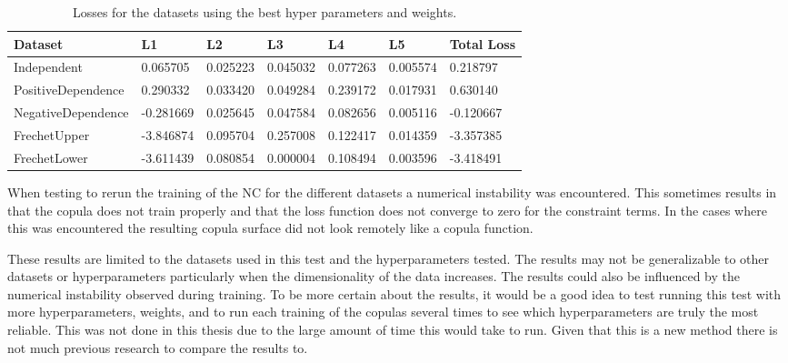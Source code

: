     
\begin{table}[h!]
    \centering
    \caption{Losses for the datasets using the best hyper parameters and weights.}
    \begin{tabular}{lllllll}
        \textbf{Dataset} & \textbf{L1}& \textbf{L2}& \textbf{L3}& \textbf{L4}& \textbf{L5}& \textbf{Total Loss} \\
        \midrule
        Independent & 0.065705 & 0.025223 & 0.045032 & 0.077263 & 0.005574 & 0.218797 \\
        PositiveDependence & 0.290332 & 0.033420 & 0.049284 & 0.239172 & 0.017931 & 0.630140 \\
        NegativeDependence & -0.281669 & 0.025645 & 0.047584 & 0.082656 & 0.005116 & -0.120667 \\
        FrechetUpper & -3.846874 & 0.095704 & 0.257008 & 0.122417 & 0.014359 & -3.357385 \\
        FrechetLower & -3.611439 & 0.080854 & 0.000004 & 0.108494 & 0.003596 & -3.418491 \\
        \end{tabular}
    \label{tab:LossesBestParameters}
\end{table}

\begin{remark}
    When testing to rerun the training of the \gls{NC} for the different datasets a numerical instability was encountered. This sometimes results in that the copula does not train properly and that the loss function does not converge to zero for the constraint terms. In the cases where this was encountered the resulting copula surface did not look remotely like a copula function. 
\end{remark}

These results are limited to the datasets used in this test and the hyperparameters tested. The results may not be generalizable to other datasets or hyperparameters particularly when the dimensionality of the data increases. The results could also be influenced by the numerical instability observed during training. To be more certain about the results, it would be a good idea to test running this test with more hyperparameters, weights, and to run each training of the copulas several times to see which hyperparameters are truly the most reliable. This was not done in this thesis due to the large amount of time this would take to run. Given that this is a new method there is not much previous research to compare the results to.  



